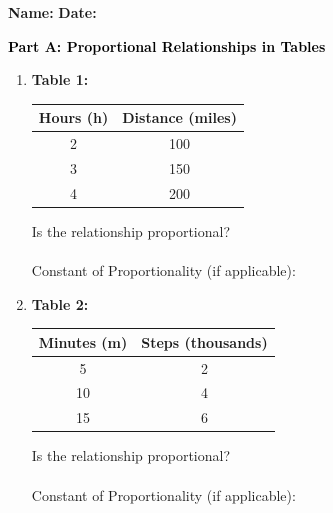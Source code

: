 \documentclass[12pt, letterpaper, fleqn]{article}
\newcommand{\blank}{\underline{\hspace{2.2cm}}}
\begin{document}
\textbf{Name:} \underline{\hspace{5cm}}
\hfill
\textbf{Date:} \underline{\hspace{3cm}}\\

\begin{tcolorbox}[colback=customteal!20]
\large\textcolor{black}{\textbf{Part A: Proportional Relationships in Tables}}
\end{tcolorbox}

\vspace{3mm}

\begin{enumerate}[itemsep=2.5cm, leftmargin=0.6cm]
\item \begin{tcolorbox}[colback=white, colframe=black, width=\textwidth]
\textbf{Table 1:}
\vspace{2mm}
\begin{center}
\begin{tabular}{|c|c|}
\hline
Hours (h) & Distance (miles) \\
\hline
2 & 100 \\
3 & 150 \\
4 & 200 \\
\hline
\end{tabular}
\end{center}
\vspace{1cm}
Is the relationship proportional? \blank \\ \\
Constant of Proportionality (if applicable): \blank
\end{tcolorbox}

\vspace{0.5cm}
\item \begin{tcolorbox}[colback=white, colframe=black, width=\textwidth]
\textbf{Table 2:}
\vspace{2mm}
\begin{center}
\begin{tabular}{|c|c|}
\hline
Minutes (m) & Steps (thousands) \\
\hline
5 & 2 \\
10 & 4 \\
15 & 6 \\
\hline
\end{tabular}
\end{center}
\vspace{1cm}
Is the relationship proportional? \blank \\ \\
Constant of Proportionality (if applicable): \blank
\end{tcolorbox}

\vspace{1.5cm}
\end{enumerate}
\end{document}
